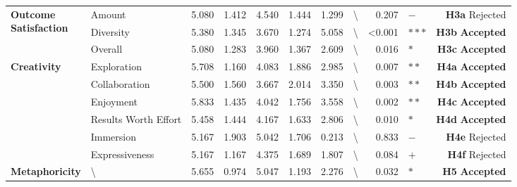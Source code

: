 \begin{table*}[t]
\begin{tabular}{llrrrrrrrlr}
\midrule
\multicolumn{1}{l}{\multirow{3}{*}{\parbox{1.6cm}{\textbf{Outcome\\Satisfaction}}}}
        & Amount                  & 5.080            & 1.412 & 4.540     & 1.444              & 1.299           & \textbackslash{} & 0.207            & $-$    &   \textbf{H3a} Rejected         \\
                 & Diversity               & 5.380            & 1.345 & 3.670     & 1.274              & 5.058           & \textbackslash{} & \textless{}0.001 & $***$  &  \textbf{H3b} \textbf{Accepted}          \\
                 & Overall                 & 5.080            & 1.283 & 3.960     & 1.367              & 2.609           & \textbackslash{} & 0.016            & $*$    &  \textbf{H3c} \textbf{Accepted}          \\
\midrule
\multicolumn{1}{l}{\multirow{6}{*}{\textbf{Creativity}~\cite{10.1145/2617588}}}       & Exploration             & 5.708           & 1.160  & 4.083    & 1.886              & 2.985           & \textbackslash{} & 0.007            & $**$   &   \textbf{H4a} \textbf{Accepted}         \\
                 & Collaboration           & 5.500             & 1.560  & 3.667    & 2.014              & 3.350            & \textbackslash{} & 0.003            & $**$   &   \textbf{H4b} \textbf{Accepted}         \\
                 & Enjoyment              & 5.833           & 1.435 & 4.042    & 1.756              & 3.558           & \textbackslash{} & 0.002            & $**$   &   \textbf{H4c} \textbf{Accepted}         \\
                 & Results Worth Effort & 5.458           & 1.444 & 4.167    & 1.633              & 2.806           & \textbackslash{} & 0.010             & $*$    &  \textbf{H4d} \textbf{Accepted}          \\
                 & Immersion       & 5.167           & 1.903 & 5.042    & 1.706               & 0.213           & \textbackslash{} & 0.833            & $-$    &   \textbf{H4e} Rejected         \\
                 & Expressiveness          & 5.167           & 1.167 & 4.375    & 1.689               & 1.807           & \textbackslash{} & 0.084            & $+$    &   \textbf{H4f} Rejected         \\
\midrule
\textbf{Metaphoricity}    & \textbackslash{}        & 5.655           & 0.974 & 5.047    & 1.193              & 2.276           & \textbackslash{} & 0.032            & $*$    &  \textbf{H5} \textbf{Accepted}
\\
\bottomrule
\end{tabular}
\label{tbl:result}
\end{table*}


